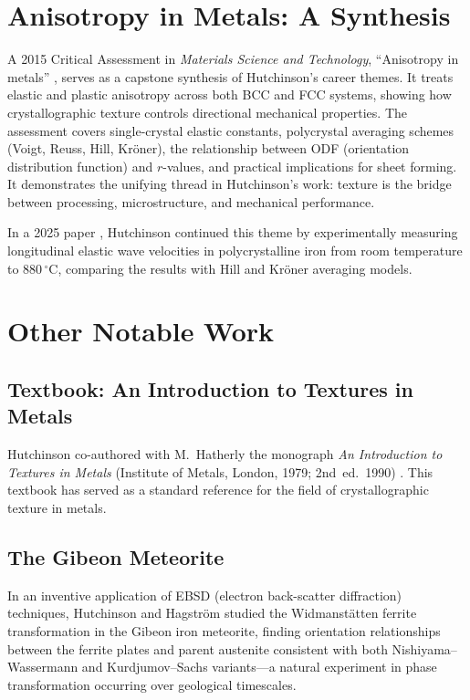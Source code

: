\documentclass[11pt,a4paper]{article}
\begin{document}
\section{Anisotropy in Metals: A Synthesis}
\label{sec:anisotropy}

A 2015 Critical Assessment in \emph{Materials Science and Technology},
``Anisotropy in metals'' \cite{Hutchinson2015}, serves as a capstone
synthesis of Hutchinson's career themes.  It treats elastic and plastic
anisotropy across both BCC and FCC systems, showing how crystallographic
texture controls directional mechanical properties.  The assessment
covers single-crystal elastic constants, polycrystal averaging schemes
(Voigt, Reuss, Hill, Kr\"oner), the relationship between ODF
(orientation distribution function) and $r$-values, and practical
implications for sheet forming.  It demonstrates the unifying thread in
Hutchinson's work: texture is the bridge between processing,
microstructure, and mechanical performance.

In a 2025 paper \cite{Hutchinson2025pssb}, Hutchinson continued this
theme by experimentally measuring longitudinal elastic wave velocities
in polycrystalline iron from room temperature to $880\,{}^\circ\mathrm{C}$,
comparing the results with Hill and Kr\"oner averaging models.

\section{Other Notable Work}
\label{sec:other}

\subsection{Textbook: An Introduction to Textures in Metals}

Hutchinson co-authored with M.~Hatherly the monograph \emph{An
Introduction to Textures in Metals} (Institute of Metals, London, 1979;
2nd~ed.\ 1990) \cite{Hatherly1979}.  This textbook has served as a
standard reference for the field of crystallographic texture in metals.

\subsection{The Gibeon Meteorite}

In an inventive application of EBSD (electron back-scatter diffraction)
techniques, Hutchinson and Hagstr\"om \cite{Hutchinson2006Met} studied
the Widmanst\"atten ferrite transformation in the Gibeon iron meteorite,
finding orientation relationships between the ferrite plates and parent
austenite consistent with both Nishiyama--Wassermann and
Kurdjumov--Sachs variants---a natural experiment in phase transformation
occurring over geological timescales.
\end{document}
